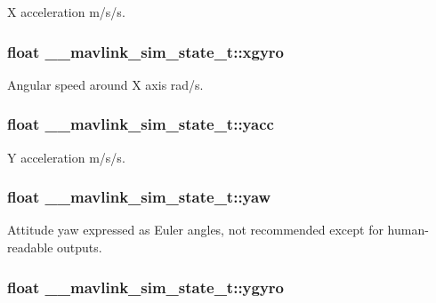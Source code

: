 X acceleration m/s/s. 

\hypertarget{struct____mavlink__sim__state__t_a59c0563e7cad212e45726c8ec8508f4a}{
\subsubsection[{xgyro}]{\setlength{\rightskip}{0pt plus 5cm}float \+\_\+\+\_\+mavlink\+\_\+sim\+\_\+state\+\_\+t\+::xgyro}}\label{struct____mavlink__sim__state__t_a59c0563e7cad212e45726c8ec8508f4a}


Angular speed around X axis rad/s. 

\hypertarget{struct____mavlink__sim__state__t_aff549378ca9cd4eb5b79a591b40e5dfe}{
\subsubsection[{yacc}]{\setlength{\rightskip}{0pt plus 5cm}float \+\_\+\+\_\+mavlink\+\_\+sim\+\_\+state\+\_\+t\+::yacc}}\label{struct____mavlink__sim__state__t_aff549378ca9cd4eb5b79a591b40e5dfe}


Y acceleration m/s/s. 

\hypertarget{struct____mavlink__sim__state__t_afeb19c5418ee1b9b5c85d023b6cfc0df}{
\subsubsection[{yaw}]{\setlength{\rightskip}{0pt plus 5cm}float \+\_\+\+\_\+mavlink\+\_\+sim\+\_\+state\+\_\+t\+::yaw}}\label{struct____mavlink__sim__state__t_afeb19c5418ee1b9b5c85d023b6cfc0df}


Attitude yaw expressed as Euler angles, not recommended except for human-\/readable outputs. 

\hypertarget{struct____mavlink__sim__state__t_addb404aaa53ea7a5cfc3c8d88be79332}{
\subsubsection[{ygyro}]{\setlength{\rightskip}{0pt plus 5cm}float \+\_\+\+\_\+mavlink\+\_\+sim\+\_\+state\+\_\+t\+::ygyro}}\label{struct____mavlink__sim__state__t_addb404aaa53ea7a5cfc3c8d88be79332}


